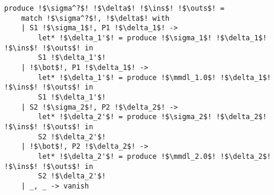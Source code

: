 \documentclass[,a4paper,oneside]{article}
\newcommand{\mmdl}{\ensuremath{\mathbb S}}
\begin{document}
\begin{verbatim}
produce !$\sigma^?$! !$\delta$! !$\ins$! !$\outs$! =
    match !$\sigma^?$!, !$\delta$! with
    | S1 !$\sigma_1$!, P1 !$\delta_1$! -> 
        let* !$\delta_1'$! = produce !$\sigma_1$! !$\delta_1$! !$\ins$! !$\outs$! in
        S1 !$\delta_1'$!
    | !$\bot$!, P1 !$\delta_1$! ->
    	let* !$\delta_1'$! = produce !$\mmdl_1.0$! !$\delta_1$! !$\ins$! !$\outs$! in
        S1 !$\delta_1'$!
    | S2 !$\sigma_2$!, P2 !$\delta_2$! -> 
        let* !$\delta_2'$! = produce !$\sigma_2$! !$\delta_2$! !$\ins$! !$\outs$! in
        S2 !$\delta_2'$!
    | !$\bot$!, P2 !$\delta_2$! -> 
        let* !$\delta_2'$! = produce !$\mmdl_2.0$! !$\delta_2$! !$\ins$! !$\outs$! in
        S2 !$\delta_2'$!
    | _, _ -> vanish
\end{verbatim}
\end{document}

